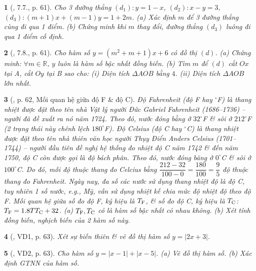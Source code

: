 \documentclass{article}
\newtheorem{baitoan}{}
\begin{document}
\begin{baitoan}[\cite{Binh_boi_duong_Toan_9_tap_1}, 7.7., p. 61]
	Cho 3 đường thẳng $(d_1):y = 1 - x$, $(d_2):x - y = 3$, $(d_3):(m + 1)x + (m - 1)y = 1 + 2m$. (a) Xác định $m$ để 3 đường thẳng cùng đi qua 1 điểm. (b) Chứng minh khi $m$ thay đổi, đường thẳng $(d_3)$ luông đi qua 1 điểm cố định.
\end{baitoan}

\begin{baitoan}[\cite{Binh_boi_duong_Toan_9_tap_1}, 7.8., p. 61]
	Cho hàm số $y = (m^2 + m + 1)x + 6$ có đồ thị $(d)$. (a) Chứng minh: $\forall m\in\mathbb{R}$, $y$ luôn là hàm số bậc nhất đồng biến. (b) Tìm $m$ để $(d)$ cắt $Ox$ tại A, cắt $Oy$ tại B sao cho: (i) Diện tích $\Delta AOB$ bằng $4$. (ii) Diện tích $\Delta AOB$ lớn nhất.
\end{baitoan}

\begin{baitoan}[\cite{Binh_boi_duong_Toan_9_tap_1}, p. 62, Mối quan hệ giữa độ F \& độ C]
	Độ Fahrenheit (độ {\rm F} hay ${}^\circ${\rm F}) là thang nhiệt được đặt theo tên nhà Vật lý người Đức Gabriel Fahrenheit (1686--1736) -- người đã đề xuất ra nó năm 1724. Theo đó, nước đóng bằng ở $32^\circ${\rm F} \& sôi ở $212^\circ${\rm F} (2 trạng thái này chênh lệch $180^\circ${\rm F}). Độ Celsius (độ {\rm C} hay ${}^\circ${\rm C}) là thang nhiệt được đặt theo tên nhà thiên văn học người Thụy Điển Anders Celsius (1701--1744) -- người đầu tiên đề nghị hệ thống đo nhiệt độ {\rm C} năm 1742 \& đến năm 1750, độ {\rm C} còn được gọi là độ bách phân. Theo đó, nước đóng băng ở $0^\circ${\rm C} \& sôi ở $100^\circ${\rm C}. Do đó, mỗi độ thuộc thang đo Celcius bằng $\dfrac{212 - 32}{100 - 0} = \dfrac{180}{100} = \dfrac{9}{5}$ độ thuộc thang đo Fahrenheit. Ngày nay, đa số các nước sử dụng thang nhiệt độ là độ {\rm C}, tuy nhiên 1 số nước, e.g., Mỹ, vẫn sử dụng nhiệt kế chia mức độ nhiệt độ theo độ {\rm F}. Mối quan hệ giữa số đo độ {\rm F}, ký hiệu là $T_{\rm F}$, \& số đo độ {\rm C}, ký hiệu là $T_{\rm C}$: $T_{\rm F} = 1.8TT_{\rm C} + 32$. (a) $T_{\rm F},T_{\rm C}$ có là hàm số bậc nhất có nhau không. (b) Xét tính đồng biến, nghịch biến của 2 hàm số này.
\end{baitoan}

\begin{baitoan}[\cite{Binh_boi_duong_Toan_9_tap_1}, VD1, p. 63]
	Xét sự biến thiên \& vẽ đồ thị hàm số $y = |2x + 3|$.
\end{baitoan}

\begin{baitoan}[\cite{Binh_boi_duong_Toan_9_tap_1}, VD2, p. 63]
	Cho hàm số $y = |x - 1| + |x - 5|$. (a) Vẽ đồ thị hàm số. (b) Xác định {\rm GTNN} của hàm số.
\end{baitoan}
\end{document}
